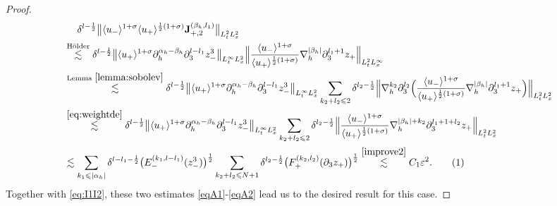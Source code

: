 \documentclass[10pt,reqno]{amsart}
\numberwithin{equation}{section}
\begin{document}
\begin{proof}
\begin{align*}
		&\ \ \ \ \delta^{l-\frac{1}{2}}\big\|\langle u_-\rangle^{1+\sigma}\langle u_+\rangle^{\frac{1}{2}(1+\sigma)}\mathbf{J}_{+,2}^{(\beta_h,l_1)}\big\|_{L^2_tL^2_x}\\
		&\stackrel{\text{H\"older}}{\lesssim}\delta^{l-\frac{1}{2}}\big\|\langle u_+\rangle^{1+\sigma}\partial_h^{\alpha_h-\beta_h}\partial_3^{l-l_1}z_-^3\big\|_{L^\infty_tL^2_x}\Big\|\frac{\langle u_-\rangle^{1+\sigma}}{\langle u_+\rangle^{\frac{1}{2}(1+\sigma)}}\nabla_h^{|\beta_h|}\partial_3^{l_1+1} z_{+}\Big\|_{L^2_tL^\infty_x}\\
		&\stackrel{\text{Lemma } \ref{lemma:sobolev}}{\lesssim}\delta^{l-\frac{1}{2}}\big\|\langle u_+\rangle^{1+\sigma}\partial_h^{\alpha_h-\beta_h}\partial_3^{l-l_1}z_-^3\big\|_{L^\infty_tL^2_x} \sum_{k_2+l_2\leqslant 2}\delta^{l_2-\frac{1}{2}}\Big\|\nabla_h^{k_2}\partial_3^{l_2}\Big(\frac{\langle u_-\rangle^{1+\sigma}}{\langle u_+\rangle^{\frac{1}{2}(1+\sigma)}}\nabla_h^{|\beta_h|}\partial_3^{l_1+1} z_{+}\Big)\Big\|_{L^2_tL^2_x}\\
		&\stackrel{\eqref{eq:weightde}}{\lesssim}\delta^{l-\frac{1}{2}}\big\|\langle u_+\rangle^{1+\sigma}\partial_h^{\alpha_h-\beta_h}\partial_3^{l-l_1}z_-^3\big\|_{L^\infty_tL^2_x}\sum_{k_2+l_2\leqslant 2}\delta^{l_2-\frac{1}{2}}\Big\|\frac{\langle u_-\rangle^{1+\sigma}}{\langle u_+\rangle^{\frac{1}{2}(1+\sigma)}}\nabla_h^{|\beta_h|+k_2}\partial_3^{l_1+1+l_2} z_{+}\Big\|_{L^2_tL^2_x}\\
		&\lesssim\sum_{k_1\leqslant|\alpha_h|}\delta^{l-l_1-\frac{1}{2}} \big(E_-^{(k_1,l-l_1)}(z_-^3)\big)^{\frac{1}{2}}\sum_{k_2+l_2\leqslant N+ 1}\delta^{l_2-\frac{1}{2}}\big(F_+^{(k_2,l_2)}(\partial_3z_+)\big)^{\frac{1}{2}}
		\stackrel{\eqref{improve2}}{\lesssim} C_1\varepsilon^2.\stepcounter{equation}\tag{\theequation}\label{eqA2}
	\end{align*}
	Together with \eqref{eq:I1I2}, these two estimates \eqref{eqA1}-\eqref{eqA2} lead us to the desired result for 
	this case. 
	
	

\end{proof}
\end{document}
